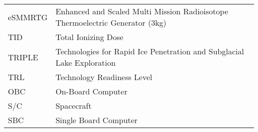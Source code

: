 \begin{longtable}[l]{ll}
eSMMRTG & Enhanced and Scaled Multi Mission Radioisotope Thermoelectric Generator (3kg) \\
TID		& Total Ionizing Dose \\
TRIPLE 	& Technologies for Rapid Ice Penetration and Subglacial Lake Exploration \\
TRL     & Technology Readiness Level \\
OBC		& On-Board Computer \\
S/C     & Spacecraft\\
SBC		& Single Board Computer \\



\end{longtable}

\cleardoublepage






